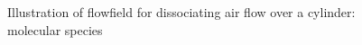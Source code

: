 \begin{figure}[hbtp]
\begin{center}
    \caption{Illustration of flowfield for dissociating air flow over a cylinder: molecular species\label{fig:5sp_air_cyl_flowfield_concentrations_molecules}}
  \end{center}
\end{figure}


